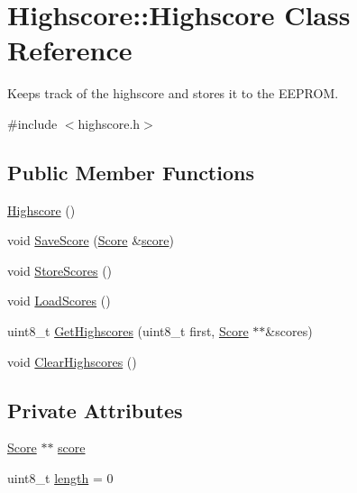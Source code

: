 \hypertarget{class_highscore_1_1_highscore}{\section{Highscore\-:\-:Highscore Class Reference}
\label{class_highscore_1_1_highscore}
}


Keeps track of the highscore and stores it to the E\-E\-P\-R\-O\-M.  




{\ttfamily \#include $<$highscore.\-h$>$}

\subsection*{Public Member Functions}
\begin{DoxyCompactItemize}
\item 
\hyperlink{class_highscore_1_1_highscore_a64076b0cd51d8045a6cac3e53e2ada79}{Highscore} ()
\item 
void \hyperlink{class_highscore_1_1_highscore_ae19e8a6c55b49d6dd874b61ef496dcea}{Save\-Score} (\hyperlink{struct_highscore_1_1_score}{Score} \&\hyperlink{class_highscore_1_1_highscore_a569a403dc24a8fa67efd7065148f4c9d}{score})
\item 
void \hyperlink{class_highscore_1_1_highscore_ad0e1b3277228a38513b5c86059ebcd6d}{Store\-Scores} ()
\item 
void \hyperlink{class_highscore_1_1_highscore_acaba923c4f4acb3c174fb5e325f1bc5e}{Load\-Scores} ()
\item 
uint8\-\_\-t \hyperlink{class_highscore_1_1_highscore_af863b0108cf33796e96efa6d0ba613a1}{Get\-Highscores} (uint8\-\_\-t first, \hyperlink{struct_highscore_1_1_score}{Score} $\ast$$\ast$\&scores)
\item 
void \hyperlink{class_highscore_1_1_highscore_ad2d0f11408e3d47c7b8434a71212f6c2}{Clear\-Highscores} ()
\end{DoxyCompactItemize}
\subsection*{Private Attributes}
\begin{DoxyCompactItemize}
\item 
\hyperlink{struct_highscore_1_1_score}{Score} $\ast$$\ast$ \hyperlink{class_highscore_1_1_highscore_a569a403dc24a8fa67efd7065148f4c9d}{score}
\item 
uint8\-\_\-t \hyperlink{class_highscore_1_1_highscore_a18a119eae9c24ab69477411b9bf45867}{length} = 0
\end{DoxyCompactItemize}


